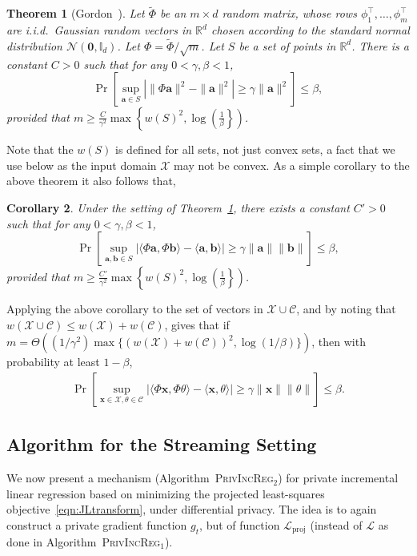 \documentclass{article}
\theoremstyle{plain}
\newtheorem{theorem}{Theorem}[section]
\newtheorem{corollary}[theorem]{Corollary}
\def \PrivIncReg {\textsc{PrivIncReg$_1$}\xspace}
\def \ProjPrivIncReg {\textsc{PrivIncReg$_2$}\xspace}
\def \CCC {\mathcal{C}}
\def \XXX {\mathcal{X}}
\def \NNN {\mathcal{N}}
\def \LLL {\mathcal{L}}
\def \proj {{\mathrm{proj}}}
\def \a {\mathbf a}
\def \b {\mathbf b}
\def \x {\mathbf x}
\def \R {\mathbb{R}}
\begin{document}
\begin{theorem}[Gordon~\cite{gordon1988milman}]\label{thm:gordon}
Let $\tilde{\Phi}$ be an $m \times d$ random matrix, whose rows $\phi_1^\top,\dots,\phi_m^\top$ are i.i.d.\ Gaussian random vectors in $\R^d$ chosen according to the standard normal distribution $\NNN(\mathbf{0},\mathbb{I}_d)$. Let $\Phi = \tilde{\Phi}/\sqrt{m}$. Let $S$ be a set of points in $\R^d$. There is a constant $C > 0$ such that for any $0 < \gamma, \beta < 1$,
$$\Pr \left [\sup_{\a \in S} \left | \| \Phi \a \|^2 - \| \a \|^2 \right | \geq  \gamma \| \a \|^2 \right ] \leq \beta,$$ 
provided that $m \geq \frac{C}{\gamma^2} \max \left \{ w(S)^2, \log \left (\frac{1}{\beta} \right \} \right )$.
\end{theorem}
Note that the $w(S)$ is defined for all sets, not just convex sets, a fact that we use below as the input domain $\XXX$ may not be convex.  As a simple corollary to the above theorem it also follows that,
\begin{corollary} \label{cor:gordon}
Under the setting of Theorem~\ref{thm:gordon}, there exists a constant $C' > 0$ such that for any $0 < \gamma, \beta < 1$,
$$\Pr \left [\sup_{\a,\b \in S} \left | \langle \Phi \a, \Phi \b \rangle - \langle \a,\b \rangle  \right | \geq \gamma \| \a \| \| \b \| \right ] \leq \beta,$$ 
provided that $m \geq \frac{C'}{\gamma^2} \max \left \{ w(S)^2, \log \left (\frac{1}{\beta} \right \} \right )$.
\end{corollary}
Applying the above corollary to the set of vectors in $\XXX \cup \CCC$, and by noting that $w(\XXX \cup \CCC) \leq w(\XXX) + w(\CCC)$, gives that if $m = \Theta((1/\gamma^2)\max\{(w(\XXX)+w(\CCC))^2,\log(1/\beta)\})$, then with probability at least $1-\beta$,
\begin{align} \label{eqn:xthetprod}
\Pr \left [\sup_{\x \in \XXX,\theta \in \CCC} \left | \langle \Phi \x, \Phi \theta \rangle - \langle \x,\theta \rangle  \right | \geq \gamma \| \x \| \| \theta \| \right ] \leq \beta.
\end{align}

\subsection{Algorithm for the Streaming Setting} \label{sec:algstream}
We now present a mechanism (Algorithm~\ProjPrivIncReg) for private incremental linear regression based on minimizing the projected least-squares objective~\eqref{eqn:JLtransform}, under differential privacy. The idea is to again construct a private gradient function $g_t$, but of function $\LLL_\proj$ (instead of $\LLL$ as done in Algorithm~\PrivIncReg). 
\end{document}
